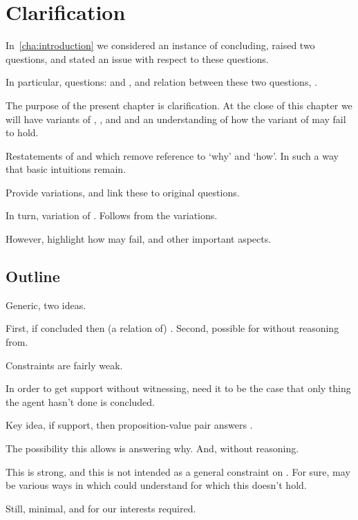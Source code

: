 \chapter{Clarification}
\label{cha:clarification}

\begin{note}
  In~\autoref{cha:introduction} we considered an instance of concluding, raised two questions, and stated an issue with respect to these questions.

  In particular, questions: \qWhy{} and \qHow{}, and relation between these two questions, \issueInclusion{}.

  The purpose of the present chapter is clarification.
  At the close of this chapter we will have variants of \qWhy{}, \qHow{}, and \issueInclusion{} and an understanding of how the variant of \issueInclusion{} may fail to hold.

  Restatements of \qWhy{} and \qHow{} which remove reference to `why' and `how'.
  In such a way that basic intuitions remain.

  Provide variations, and link these to original questions.

  In turn, variation of \issueInclusion{}.
  Follows from the variations.

  However, highlight how may fail, and other important aspects.
\end{note}

\section{Outline}
\label{cha:clarification:sec:outline}

\begin{note}[Support]
  Generic, two ideas.

  First, if concluded then (a relation of) \support{}.
  Second, possible for \support{} without reasoning from.

  Constraints are fairly weak.

  In order to get support without witnessing, need it to be the case that only thing the agent hasn't done is concluded.
\end{note}

\begin{note}
  Key idea, if support, then proposition-value pair answers \qWhy{}.

  The possibility this allows is \support{} answering why.
  And, without reasoning.

  This is strong, and this is not intended as a general constraint on \qWhy{}.
  For sure, may be various ways in which could understand \qWhy{} for which this doesn't hold.

  Still, minimal, and for our interests required.
\end{note}

